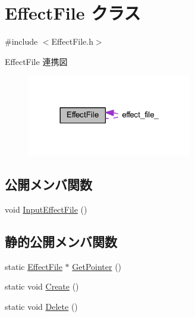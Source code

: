 \hypertarget{class_effect_file}{}\section{Effect\+File クラス}
\label{class_effect_file}


{\ttfamily \#include $<$Effect\+File.\+h$>$}



Effect\+File 連携図\nopagebreak
\begin{figure}[H]
\begin{center}
\leavevmode
\includegraphics[width=204pt]{class_effect_file__coll__graph}
\end{center}
\end{figure}
\subsection*{公開メンバ関数}
\begin{DoxyCompactItemize}
\item 
void \mbox{\hyperlink{class_effect_file_a8106530f6c71c81e7e2843cec9fe1094}{Input\+Effect\+File}} ()
\end{DoxyCompactItemize}
\subsection*{静的公開メンバ関数}
\begin{DoxyCompactItemize}
\item 
static \mbox{\hyperlink{class_effect_file}{Effect\+File}} $\ast$ \mbox{\hyperlink{class_effect_file_a0f61b1e53e67b28cb46f93b6ba20f941}{Get\+Pointer}} ()
\item 
static void \mbox{\hyperlink{class_effect_file_a637faf44d3465e7fe8a665d339680ba8}{Create}} ()
\item 
static void \mbox{\hyperlink{class_effect_file_a0d9799f2ea38fa594b59e43183d70ce0}{Delete}} ()
\end{DoxyCompactItemize}
